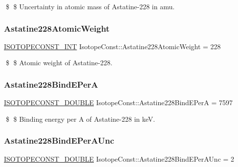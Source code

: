 \$ \$ Uncertainty in atomic mass of Astatine-\/228 in amu. \mbox{\label{group___isotope_const-_astatine-_at228_gae1ccedf3b64e0d3cd20579a6683537c2}} 
\subsubsection{\texorpdfstring{Astatine228\+Atomic\+Weight}{Astatine228AtomicWeight}}
{\footnotesize\ttfamily \mbox{\hyperlink{group___isotope_const-_macros_ga5f18360b3e99483a35c32d789e62621c}{I\+S\+O\+T\+O\+P\+E\+C\+O\+N\+S\+T\+\_\+\+I\+NT}} Isotope\+Const\+::\+Astatine228\+Atomic\+Weight = 228}

\$ \$ Atomic weight of Astatine-\/228. \mbox{\label{group___isotope_const-_astatine-_at228_gab1d7e1be27b5099fff8069cd356759a7}} 
\subsubsection{\texorpdfstring{Astatine228\+Bind\+E\+PerA}{Astatine228BindEPerA}}
{\footnotesize\ttfamily \mbox{\hyperlink{group___isotope_const-_macros_ga8f45a7272ce02c0b4c65c44636ed719a}{I\+S\+O\+T\+O\+P\+E\+C\+O\+N\+S\+T\+\_\+\+D\+O\+U\+B\+LE}} Isotope\+Const\+::\+Astatine228\+Bind\+E\+PerA = 7597}

\$ \$ Binding energy per A of Astatine-\/228 in keV. \mbox{\label{group___isotope_const-_astatine-_at228_ga5948ee66815a15885b744d93dfaf6491}} 
\subsubsection{\texorpdfstring{Astatine228\+Bind\+E\+Per\+A\+Unc}{Astatine228BindEPerAUnc}}
{\footnotesize\ttfamily \mbox{\hyperlink{group___isotope_const-_macros_ga8f45a7272ce02c0b4c65c44636ed719a}{I\+S\+O\+T\+O\+P\+E\+C\+O\+N\+S\+T\+\_\+\+D\+O\+U\+B\+LE}} Isotope\+Const\+::\+Astatine228\+Bind\+E\+Per\+A\+Unc = 2}

